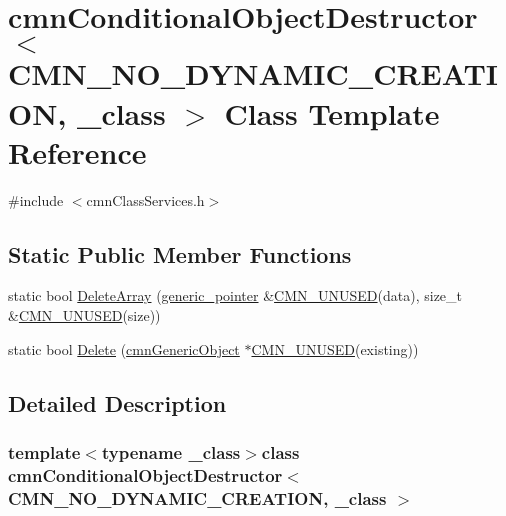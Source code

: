 \hypertarget{classcmn_conditional_object_destructor_3_01_c_m_n___n_o___d_y_n_a_m_i_c___c_r_e_a_t_i_o_n_00_01__class_01_4}{}\section{cmn\+Conditional\+Object\+Destructor$<$ C\+M\+N\+\_\+\+N\+O\+\_\+\+D\+Y\+N\+A\+M\+I\+C\+\_\+\+C\+R\+E\+A\+T\+I\+O\+N, \+\_\+class $>$ Class Template Reference}
\label{classcmn_conditional_object_destructor_3_01_c_m_n___n_o___d_y_n_a_m_i_c___c_r_e_a_t_i_o_n_00_01__class_01_4}


{\ttfamily \#include $<$cmn\+Class\+Services.\+h$>$}

\subsection*{Static Public Member Functions}
\begin{DoxyCompactItemize}
\item 
static bool \hyperlink{classcmn_conditional_object_destructor_3_01_c_m_n___n_o___d_y_n_a_m_i_c___c_r_e_a_t_i_o_n_00_01__class_01_4_a71b99b0b069f4a59f23c025ec9e196ff}{Delete\+Array} (\hyperlink{classcmn_generic_object}{generic\+\_\+pointer} \&\hyperlink{cmn_portability_8h_a021894e2626935fa2305434b1e893ff6}{C\+M\+N\+\_\+\+U\+N\+U\+S\+E\+D}(data), size\+\_\+t \&\hyperlink{cmn_portability_8h_a021894e2626935fa2305434b1e893ff6}{C\+M\+N\+\_\+\+U\+N\+U\+S\+E\+D}(size))
\item 
static bool \hyperlink{classcmn_conditional_object_destructor_3_01_c_m_n___n_o___d_y_n_a_m_i_c___c_r_e_a_t_i_o_n_00_01__class_01_4_a3343c85a6cefb48df2e3f2e5dd2dcab6}{Delete} (\hyperlink{classcmn_generic_object}{cmn\+Generic\+Object} $\ast$\hyperlink{cmn_portability_8h_a021894e2626935fa2305434b1e893ff6}{C\+M\+N\+\_\+\+U\+N\+U\+S\+E\+D}(existing))
\end{DoxyCompactItemize}


\subsection{Detailed Description}
\subsubsection*{template$<$typename \+\_\+class$>$class cmn\+Conditional\+Object\+Destructor$<$ C\+M\+N\+\_\+\+N\+O\+\_\+\+D\+Y\+N\+A\+M\+I\+C\+\_\+\+C\+R\+E\+A\+T\+I\+O\+N, \+\_\+class $>$}

